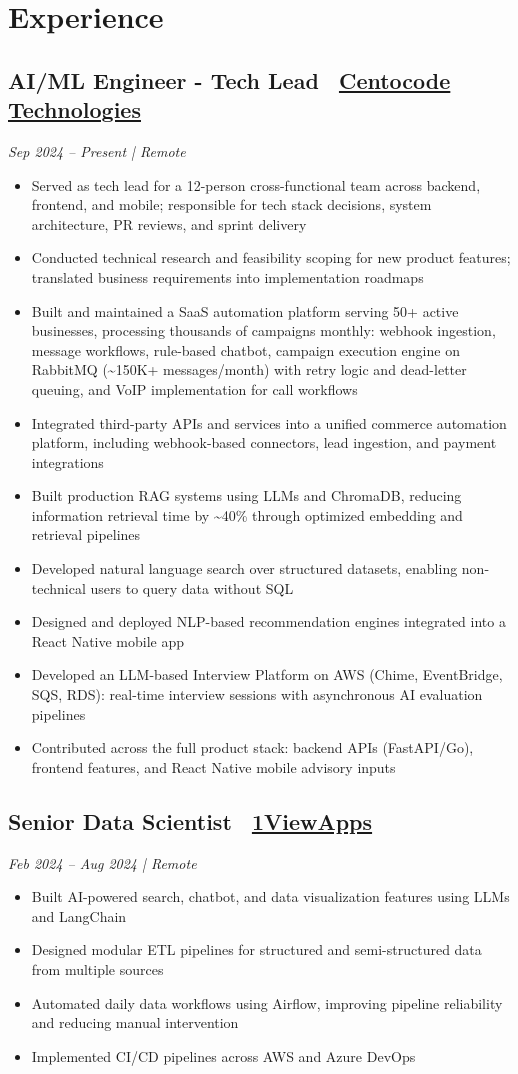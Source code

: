 \documentclass[10pt,a4paper]{article}
\newcommand{\job}[4]{%
  \subsection*{\textbf{#1} \textendash\ \href{#3}{#2}}%
  \textit{#4}\par\vspace{1pt}%
}
\begin{document}
\section{Experience}

\job{AI/ML Engineer - Tech Lead}{Centocode Technologies}{https://www.centocode.com}{Sep 2024 -- Present | Remote}
\begin{itemize}
  \item Served as tech lead for a 12-person cross-functional team across backend, frontend, and mobile; responsible for tech stack decisions, system architecture, PR reviews, and sprint delivery
  \item Conducted technical research and feasibility scoping for new product features; translated business requirements into implementation roadmaps
  \item Built and maintained a SaaS automation platform serving 50+ active businesses, processing thousands of campaigns monthly: webhook ingestion, message workflows, rule-based chatbot, campaign execution engine on RabbitMQ (\textasciitilde150K+ messages/month) with retry logic and dead-letter queuing, and VoIP implementation for call workflows
  \item Integrated third-party APIs and services into a unified commerce automation platform, including webhook-based connectors, lead ingestion, and payment integrations
  \item Built production RAG systems using LLMs and ChromaDB, reducing information retrieval time by \textasciitilde40\% through optimized embedding and retrieval pipelines
  \item Developed natural language search over structured datasets, enabling non-technical users to query data without SQL
  \item Designed and deployed NLP-based recommendation engines integrated into a React Native mobile app
  \item Developed an LLM-based Interview Platform on AWS (Chime, EventBridge, SQS, RDS): real-time interview sessions with asynchronous AI evaluation pipelines
  \item Contributed across the full product stack: backend APIs (FastAPI/Go), frontend features, and React Native mobile advisory inputs
\end{itemize}

\job{Senior Data Scientist}{1ViewApps}{https://1viewapps.com/etl/}{Feb 2024 -- Aug 2024 | Remote}
\begin{itemize}
  \item Built AI-powered search, chatbot, and data visualization features using LLMs and LangChain
  \item Designed modular ETL pipelines for structured and semi-structured data from multiple sources
  \item Automated daily data workflows using Airflow, improving pipeline reliability and reducing manual intervention
  \item Implemented CI/CD pipelines across AWS and Azure DevOps
\end{itemize}
\end{document}
